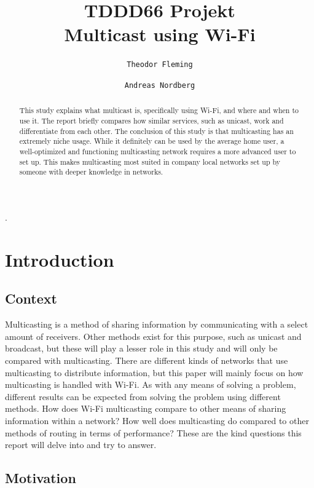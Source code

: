 \documentclass[9pt,a4paper]{acmproc}
\author{
  \texttt{Theodor Fleming}
  \and
  \texttt{Andreas Nordberg}
}
\begin{document}

\title{%
	TDDD66 Projekt \\
	\large Multicast using Wi-Fi}
\maketitle

\clearpage
.
\clearpage

\begin{abstract}

This study explains what multicast is, specifically using Wi-Fi, and where and when to use it. The report briefly compares how similar services, such as unicast, work and differentiate from each other. The conclusion of this study is that multicasting has an extremely niche usage. While it definitely can be used by the average home user, a well-optimized and functioning multicasting network requires a more advanced user to set up. This makes multicasting most suited in company local networks set up by someone with deeper knowledge in networks.
\end{abstract}

\clearpage

\section{Introduction}

\subsection{Context}

Multicasting is a method of sharing information by communicating with a select amount of receivers. Other methods exist for this purpose, such as unicast and broadcast, but these will play a lesser role in this study and will only be compared with multicasting. There are different kinds of networks that use multicasting to distribute information, but this paper will mainly focus on how multicasting is handled with Wi-Fi. As with any means of solving a problem, different results can be expected from solving the problem using different methods. 
How does Wi-Fi multicasting compare to other means of sharing information within a network? How well does multicasting do compared to other methods of routing in terms of performance? These are the kind questions this report will delve into and try to answer.  

\subsection{Motivation}
\end{document}
